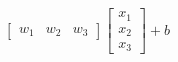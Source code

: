 \documentclass[preview]{standalone}
\begin{document}
\begin{align*}
\begin{bmatrix} w_1 & w_2 & w_3 \end{bmatrix} \begin{bmatrix} x_1 \\ x_2 \\ x_3\end{bmatrix} + b
\end{align*}
\end{document}
